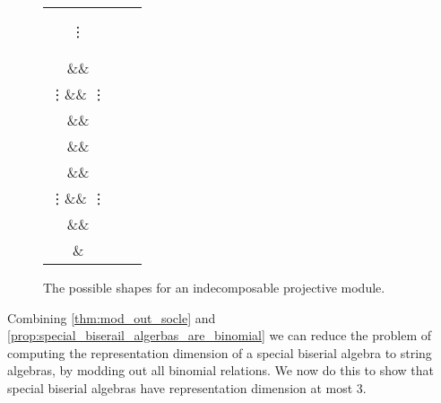 \begin{figure}
	\centering
\setlength{\tabcolsep}{30pt}
\begin{tabular}{ccc}
	\begin{tikzcd}
	\bullet\ar[d]\\
	\bullet\ar[d]\\
	\vdots\ar[d]\\
	\bullet\ar[d]\\
	\bullet
	\end{tikzcd}
	&
	\begin{tikzcd}[ampersand replacement=\&, column sep = 10pt]
	\&\bullet\ar[dl]\ar[dr]\\
	\bullet\ar[d] \&\& \bullet\ar[d]\\
	\vdots\ar[d] \&\& \vdots\ar[d]\\
	\bullet \&\& \bullet\ar[d]\\
	\&\&\bullet
	\end{tikzcd}
	&
	\begin{tikzcd}[ampersand replacement=\&, column sep = 10pt]
	\&\bullet\ar[dl]\ar[dr]\\
	\bullet\ar[d] \&\& \bullet\ar[d]\\
	\vdots\ar[d] \&\& \vdots\ar[d]\\
	\bullet\ar[dr] \&\& \bullet\ar[dl]\\
	\&\bullet
	\end{tikzcd}
\end{tabular}

\caption{The possible shapes for an indecomposable projective module.}\label{fig:biserial_projectives}
\end{figure}

Combining \cref{thm:mod_out_socle} and \cref{prop:special_biserail_algerbas_are_binomial} we can reduce the problem of computing the representation dimension of a special biserial algebra to string algebras, by modding out all binomial relations. We now do this to show that special biserial algebras have representation dimension at most 3.

